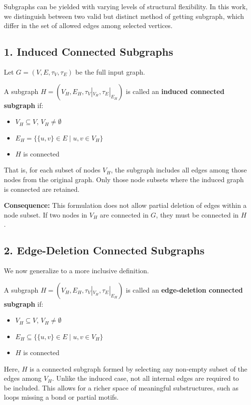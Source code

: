 \documentclass{article}
\begin{document}
Subgraphs can be yielded with varying levels of structural flexibility. In this work, we distinguish between two valid but distinct method of getting subgraph, which differ in the set of allowed edges among selected vertices.

\subsection*{1. Induced Connected Subgraphs}

Let \( G = (V, E, \tau_V, \tau_E) \) be the full input graph.

A subgraph \( H = (V_H, E_H, \tau_V|_{V_H}, \tau_E|_{E_H}) \) is called an \textbf{induced connected subgraph} if:
\begin{itemize}
    \item \( V_H \subseteq V \), \( V_H \neq \emptyset \)
    \item \( E_H = \{ \{u,v\} \in E \mid u,v \in V_H \} \)
    \item \( H \) is connected
\end{itemize}

That is, for each subset of nodes \( V_H \), the subgraph includes all edges among those nodes from the original graph. Only those node subsets where the induced graph is connected are retained.

\textbf{Consequence:} This formulation does not allow partial deletion of edges within a node subset. If two nodes in \( V_H \) are connected in \( G \), they must be connected in \( H \).

\subsection*{2. Edge-Deletion Connected Subgraphs}

We now generalize to a more inclusive definition.

A subgraph \( H = (V_H, E_H, \tau_V|_{V_H}, \tau_E|_{E_H}) \) is called an \textbf{edge-deletion connected subgraph} if:
\begin{itemize}
    \item \( V_H \subseteq V \), \( V_H \neq \emptyset \)
    \item \( E_H \subseteq \{ \{u,v\} \in E \mid u,v \in V_H \} \)
    \item \( H \) is connected
\end{itemize}

Here, \( H \) is a connected subgraph formed by selecting any non-empty subset of the edges among \( V_H \). Unlike the induced case, not all internal edges are required to be included. This allows for a richer space of meaningful substructures, such as loops missing a bond or partial motifs.
\end{document}
